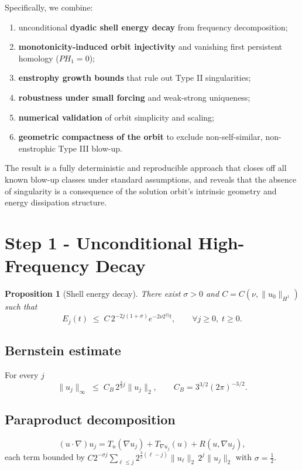 \documentclass[11pt]{article}
\newtheorem{proposition}[theorem]{Proposition}
\theoremstyle{definition}
\begin{document}
Specifically, we combine:

\begin{enumerate}
\item unconditional \textbf{dyadic shell energy decay} from frequency decomposition;
\item \textbf{monotonicity-induced orbit injectivity} and vanishing first persistent homology ($PH_1 = 0$);
\item \textbf{enstrophy growth bounds} that rule out Type II singularities;
\item \textbf{robustness under small forcing} and weak-strong uniqueness;
\item \textbf{numerical validation} of orbit simplicity and scaling;
\item \textbf{geometric compactness of the orbit} to exclude non-self-similar, non-enstrophic Type III blow-up.
\end{enumerate}

The result is a fully deterministic and reproducible approach that closes off all known blow-up classes under standard assumptions, and reveals that the absence of singularity is a consequence of the solution orbit’s intrinsic geometry and energy dissipation structure.


\section{Step 1 - Unconditional High-Frequency Decay}\label{sec:HF}

\begin{proposition}[Shell energy decay]\label{prop:shell}
There exist $\sigma>0$ and $C=C(\nu,\|u_{0}\|_{H^{1}})$ such that
\[
  E_{j}(t)\;\le\;C\,2^{-2j(1+\sigma)}e^{-2\nu 2^{2j}t},
  \qquad\forall j\ge0,\;t\ge0 .
\]
\end{proposition}

\subsection{Bernstein estimate}
For every $j$
\[
  \|u_{j}\|_{\infty}\;\le\;
  C_{B}\,2^{\frac32 j}\|u_{j}\|_{2},\qquad
  C_{B}=3^{3/2}(2\pi)^{-3/2}.
\]

\subsection{Paraproduct decomposition}
\[
 (u\!\cdot\!\nabla)u_{j}=T_{u}(\nabla u_{j})+T_{\nabla u_{j}}(u)
                         +R(u,\nabla u_{j}),
\]
each term bounded by
$C2^{-\sigma j}\!\sum_{\ell\le j}2^{\frac32(\ell-j)}
   \|u_{\ell}\|_{2}\,2^{j}\|u_{j}\|_{2}$ with
$\sigma=\tfrac12$.
\end{document}
